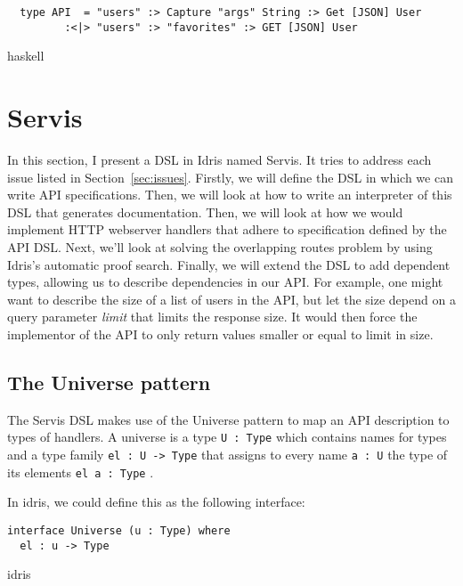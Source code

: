 \documentclass[12pt,a4paper]{article}
\begin{document}
\begin{listing}
\begin{verbatim}
  type API  = "users" :> Capture "args" String :> Get [JSON] User
         :<|> "users" :> "favorites" :> GET [JSON] User
\end{verbatim}{haskell}
\caption{An example of overlapping routes. The capture will be chosen if args equals "favorites"}
\end{listing}



\section{Servis}
In this section, I present a DSL in Idris named Servis. It tries to address each issue listed in Section~\ref{sec:issues}. Firstly, we will define the DSL in which we can write API specifications. Then, we will look at how to write an interpreter of this DSL that generates documentation. Then, we will look at how we would implement HTTP webserver handlers that adhere to specification defined by the API DSL\@. Next, we'll look at solving the overlapping routes problem by using Idris's automatic proof search.
Finally, we will extend the DSL to add dependent types, allowing us to describe dependencies in our API\@.  For example, one might want to describe  the size of a list of users in the API, but let the size depend on a query parameter \emph{limit} that limits the response size.  It would then force the implementor of the API to only return values smaller or equal to limit in size.

\subsection{The Universe pattern}
The Servis DSL makes use of the Universe pattern to map an API description to types of handlers.
 A universe is a type \texttt{U : Type} which contains names for types and a type family \texttt{el : U -> Type} that assigns to every name \texttt{a : U} the type of its elements \texttt{el a : Type} \cite{Altenkirch}\@.

 In idris, we could define this as the following interface:
 \begin{listing}
 \begin{verbatim}
interface Universe (u : Type) where
  el : u -> Type
 \end{verbatim}{idris}
   \caption{Universe interface in Idris}
 \end{listing}
\end{document}
